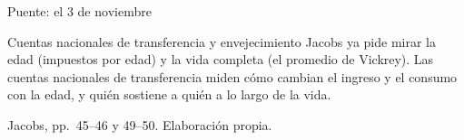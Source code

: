 \documentclass[aspectratio=169,11pt]{beamer}
\newcommand{\fuente}[1]{\par\vfill{\small\color{cGris}#1\par}}
\begin{document}
\begin{frame}{Puente: el 3 de noviembre}
  \begin{block}{Cuentas nacionales de transferencia y envejecimiento}
    Jacobs ya pide mirar la edad (impuestos por edad) y la vida completa (el promedio de Vickrey). Las cuentas nacionales de transferencia miden cómo cambian el ingreso y el consumo con la edad, y quién sostiene a quién a lo largo de la vida.
  \end{block}
  \fuente{Jacobs, pp.~45--46 y 49--50. Elaboración propia.}
\end{frame}
\end{document}
